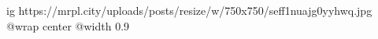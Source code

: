  
 
 
 
 

\ifcmt
  ig https://mrpl.city/uploads/posts/resize/w/750x750/seff1nuajg0yyhwq.jpg
  @wrap center
  @width 0.9
\fi
